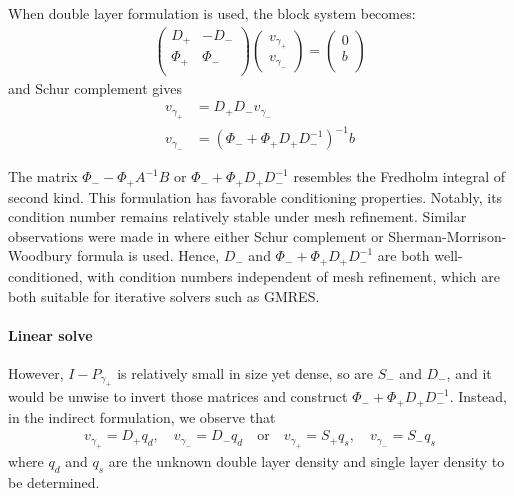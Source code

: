 When double layer formulation is used, the block system becomes:
\begin{align}
\left(
\begin{array}{cc}
D_+ & -D_- \\
\Phi_+ & \Phi_- \\
\end{array}
\right)
\left(
\begin{array}{c}
v_{\gamma_+}\\
v_{\gamma_-}
\end{array}
\right)
=
\left(
\begin{array}{c}
0 \\
b \\
\end{array}
\right)
\end{align}
and Schur complement gives
\begin{subequations}
\begin{align}
v_{\gamma_+} &= D_+D_-v_{\gamma_-}\\
v_{\gamma_-} &= (\Phi_-+\Phi_+D_+D_-^{-1})^{-1}b
\end{align}
\end{subequations}


The matrix $\Phi_--\Phi_+A^{-1}B$ or $\Phi_-+\Phi_+D_+D_-^{-1}$ resembles the Fredholm integral of second kind. This formulation has favorable conditioning properties. Notably, its condition number remains relatively stable under mesh refinement. Similar observations were made in \cite{feng2020fft,ren2022fft,ying2007kernel,gillis2018fast,gillis20192d,li1998fast,tan2009fast} where either Schur complement or Sherman-Morrison-Woodbury formula is used. Hence, $D_{-}$ and $\Phi_-+\Phi_+D_+D_-^{-1}$ are both well-conditioned, with condition numbers independent of mesh refinement, which are both suitable for iterative solvers such as GMRES.

\paragraph{Linear solve}
However, $I-P_{\gamma_+}$ is relatively small in size yet dense, so are $S_{-}$ and $D_{-}$, and it would be unwise to invert those matrices and construct $\Phi_-+\Phi_+D_+D_-^{-1}$. Instead, in the indirect formulation, we observe that
\begin{align}
v_{\gamma_+}=D_+q_d,\quad v_{\gamma_-}=D_-q_d\quad\mbox{or}\quad v_{\gamma_+}=S_+q_s,\quad v_{\gamma_-}=S_-q_s
\end{align} 
where $q_d$ and $q_s$ are the unknown double layer density and single layer density to be determined.

